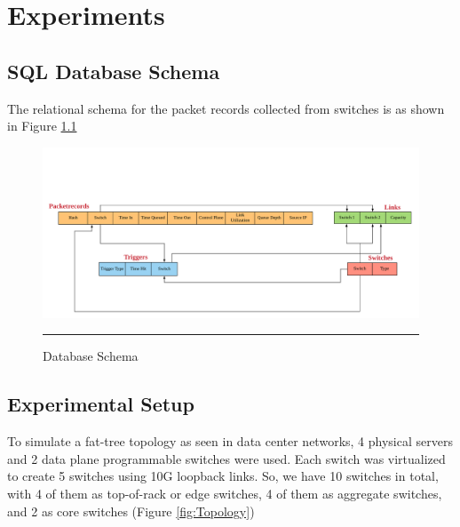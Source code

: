 
\chapter{Experiments} %

\label{Chapter3} %


\section{SQL Database Schema}

The relational schema for the packet records collected from switches is as shown in Figure \ref{fig:Schema}
\begin{figure}[htbp]
	\centering
		\includegraphics[width=1.0\columnwidth]{Figures/Schema.png}
		\rule{35em}{0.5pt}
	\caption[RDBMS Schema]{Database Schema}
	\label{fig:Schema}
\end{figure}


\section{Experimental Setup}

To simulate a fat-tree topology as seen in data center networks, 4 physical servers and 2 data plane programmable switches were used. Each switch
was virtualized to create 5 switches using 10G loopback links. So, we have 10 switches in total, with 4 of them as top-of-rack or edge switches,
4 of them as aggregate switches, and 2 as core switches (Figure \ref{fig:Topology})

